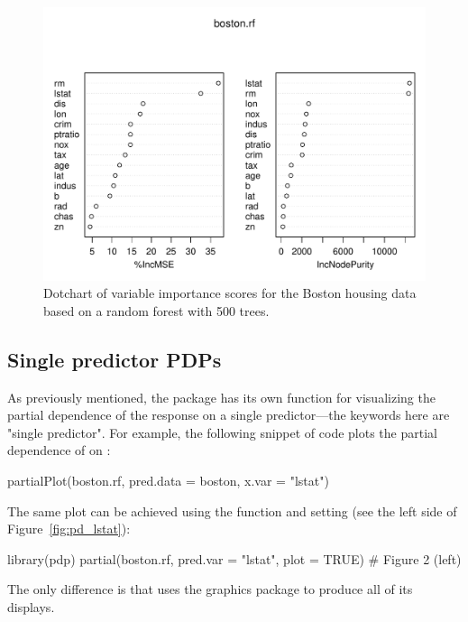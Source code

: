\begin{figure}[!htbp]
  \centering
  \includegraphics[width=1.0\linewidth]{boston_rf_vimp}
  \caption{Dotchart of variable importance scores for the Boston housing data based on a random forest with 500 trees.}
  \label{fig:plotmo_vs_partial}
\end{figure}


\subsection{Single predictor PDPs}

As previously mentioned, the  package has its own  function for visualizing the partial dependence of the response on a single predictor---the keywords here are "single predictor". For example, the following snippet of code plots the partial dependence of  on :
\begin{example}
partialPlot(boston.rf, pred.data = boston, x.var = "lstat")
\end{example}
The same plot can be achieved using the  function and setting  (see the left side of Figure~\ref{fig:pd_lstat}):
\begin{example}
library(pdp)
partial(boston.rf, pred.var = "lstat", plot = TRUE)  # Figure 2 (left)
\end{example}
The only difference is that  uses the  graphics package to produce all of its displays.


